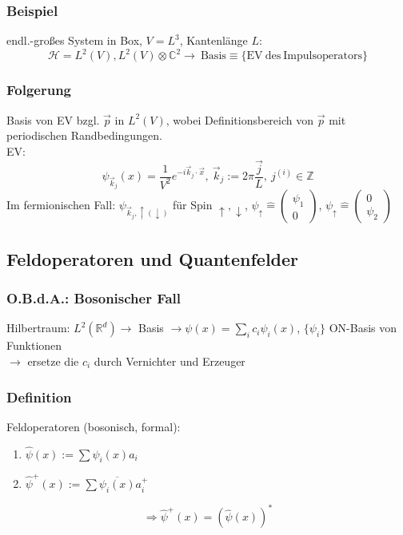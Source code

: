 \documentclass[twoside,a4paper]{scrartcl}
\newcommand{\R}{\mathbb{R}}
\newcommand{\C}{\mathbb{C}}
\renewcommand{\1}{\mathds{1}}
\newcommand{\Ra}{\Rightarrow}
\newcommand{\ra}{\rightarrow}
\renewcommand{\H}{\mathcal{H}}
\renewcommand{\R}{\mathbb{R}}
\renewcommand{\C}{\mathbb{C}}
\begin{document}
\subsubsection*{Beispiel}
endl.-großes System in Box, $V=L^3$, Kantenlänge $L$:
$$\H=L^2(V), L^2(V) \otimes \C^2 \ra \ \mathrm{Basis} \equiv \{\mathrm{EV \ des \ Impulsoperators} \}$$
\subsubsection*{Folgerung}
Basis von EV bzgl. $\vec p$ in $L^2(V)$, wobei Definitionsbereich von $\vec p$ mit periodischen Randbedingungen.\\
EV: $$\psi_{\vec k_j}(x)=\frac{1}{V^2}e^{-i\vec k_j \cdot \vec x}, \ \vec k_j:= 2\pi \frac{\vec j}{L}, \ j^{(i)} \in \mathbb{Z}$$
Im fermionischen Fall:
$\psi_{\vec k_j, \uparrow(\downarrow)}$ für Spin $\uparrow,\downarrow$, $\psi_\uparrow \mathrel{\widehat{=}} \begin{pmatrix}\psi_1\\ 0 \end{pmatrix}$, $\psi_\uparrow \mathrel{\widehat{=}} \begin{pmatrix}0\\ \psi_2 \end{pmatrix}$


\subsection{Feldoperatoren und Quantenfelder}
\subsubsection*{O.B.d.A.: Bosonischer Fall}
Hilbertraum: $L^2(\R^d) \ra$ Basis $\ra \psi(x)=\sum_i c_i \psi_i(x)$, $\{\psi_i\}$ ON-Basis von Funktionen\\
$\ra$ ersetze die $c_i$ durch Vernichter und Erzeuger
\subsubsection*{Definition}
Feldoperatoren (bosonisch, formal):
\begin{enumerate}
\item $\hat \psi(x):= \sum \psi_i(x)a_i$
\item $\hat \psi^+(x):= \sum \overline{\psi_i(x)}a_i^+$
\end{enumerate}
$$\Ra \hat \psi^+(x)=(\hat \psi(x))^*$$
\end{document}
